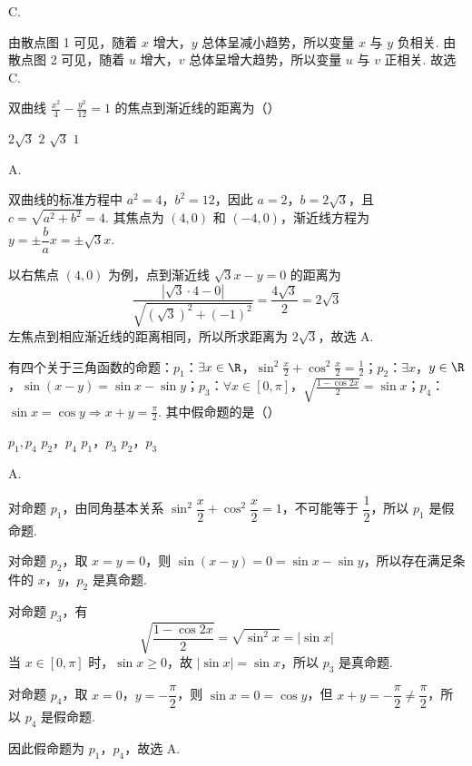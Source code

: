 \begin{answer}
C.
\end{answer}

\begin{solution}
由散点图 1 可见，随着 \(x\) 增大，\(y\) 总体呈减小趋势，所以变量 \(x\) 与 \(y\) 负相关. 由散点图 2 可见，随着 \(u\) 增大，\(v\) 总体呈增大趋势，所以变量 \(u\) 与 \(v\) 正相关.
故选 C.
\end{solution}

\begin{problem}
双曲线 \(\frac{x^2}{4} - \frac{y^2}{12} = 1\) 的焦点到渐近线的距离为（\quad）

\choices
    {\(2 \sqrt{3}\)}
    {\(2\)}
    {\(\sqrt{3}\)}
    {\(1\)}
\end{problem}

\begin{answer}
A.
\end{answer}

\begin{solution}
双曲线的标准方程中 \(a^2=4\)，\(b^2=12\)，因此
\(a=2\)，\(b=2\sqrt3\)，且
\(c=\sqrt{a^2+b^2}=4\). 其焦点为 \((4,0)\) 和 \((-4,0)\)，渐近线方程为
\(y=\pm\dfrac ba x=\pm\sqrt3x\).

以右焦点 \((4,0)\) 为例，点到渐近线 \(\sqrt3x-y=0\) 的距离为
\[
\frac{|\sqrt3\cdot4-0|}{\sqrt{(\sqrt3)^2+(-1)^2}}
=\frac{4\sqrt3}{2}=2\sqrt3
\]
左焦点到相应渐近线的距离相同，所以所求距离为 \(2\sqrt3\)，故选 A.
\end{solution}

\begin{problem}
有四个关于三角函数的命题：\(p_1\)：\(\exists x \in \R\)，\(\sin^2 \frac{x}{2} + \cos^2 \frac{x}{2} = \frac{1}{2}\)；\(p_2\)：\(\exists x\)，\(y \in \R\)，\(\sin (x - y) = \sin x - \sin y\)；\(p_3\)：\(\forall x \in \left[0,\pi \right]\)，\(\sqrt{\frac{1 - \cos 2x}{2}} = \sin x\)；\(p_4\)：\(\sin x = \cos y \Rightarrow x + y = \frac{\pi}{2}\). 其中假命题的是（\quad）

\choices
    {\(p_1, p_4\)}
    {\(p_2\)，\(p_4\)}
    {\(p_1\)，\(p_3\)}
    {\(p_2\)，\(p_3\)}
\end{problem}

\begin{answer}
A.
\end{answer}

\begin{solution}
对命题 \(p_1\)，由同角基本关系
\(\sin^2\dfrac{x}{2}+\cos^2\dfrac{x}{2}=1\)，不可能等于 \(\dfrac12\)，所以 \(p_1\) 是假命题.

对命题 \(p_2\)，取 \(x=y=0\)，则
\(\sin(x-y)=0=\sin x-\sin y\)，所以存在满足条件的 \(x\)，\(y\)，\(p_2\) 是真命题.

对命题 \(p_3\)，有
\[
\sqrt{\frac{1-\cos2x}{2}}=\sqrt{\sin^2x}=|\sin x|
\]
当 \(x\in[0,\pi]\) 时，\(\sin x\geqslant0\)，故 \(|\sin x|=\sin x\)，所以 \(p_3\) 是真命题.

对命题 \(p_4\)，取 \(x=0\)，\(y=-\dfrac\pi2\)，则
\(\sin x=0=\cos y\)，但 \(x+y=-\dfrac\pi2\neq\dfrac\pi2\)，所以 \(p_4\) 是假命题.

因此假命题为 \(p_1\)，\(p_4\)，故选 A.
\end{solution}

